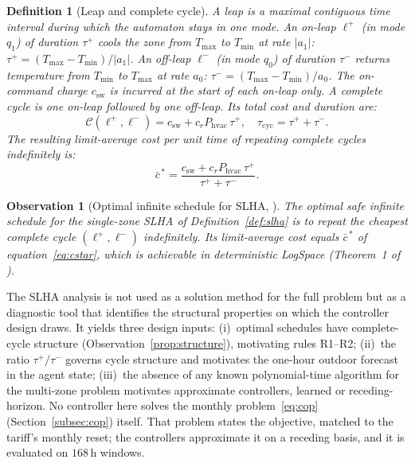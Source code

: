 \documentclass[pdflatex,sn-mathphys-num,iicol]{sn-jnl}
\theoremstyle{thmstyleone}\newtheorem{proposition}{Proposition}\newtheorem{corollary}{Corollary}
\theoremstyle{thmstyletwo}\newtheorem{remark}{Remark}\newtheorem{observation}{Observation}
\theoremstyle{thmstylethree}\newtheorem{definition}{Definition}
\newcommand{\Tmin}{T_{\min}}
\newcommand{\Tmax}{T_{\max}}
\newcommand{\csw}{c_{\mathrm{sw}}}
\newcommand{\Phvac}{P_{\mathrm{hvac}}}
\newcommand{\taup}{\tau^{+}}
\newcommand{\taum}{\tau^{-}}
\begin{document}
 
\begin{definition}[Leap and complete cycle]
\label{def:leap}
A \emph{leap} is a maximal contiguous time interval during which the automaton stays in one mode. An \emph{on-leap} $\ell^+$ (in mode $q_1$) of duration $\taup$ cools the zone from $\Tmax$ to $\Tmin$ at rate $|a_1|$: $\taup=({\Tmax-\Tmin})/{|a_1|}$. An \emph{off-leap} $\ell^-$ (in mode $q_0$) of duration $\taum$ returns temperature from $\Tmin$ to $\Tmax$ at rate $a_0$: $\taum=({\Tmax-\Tmin})/{a_0}$. The on-command charge $\csw$ is incurred at the start of each on-leap only. A \emph{complete cycle} is one on-leap followed by one off-leap. Its total cost and duration are:
\begin{equation}
  \mathcal{C}(\ell^+,\ell^-)
  = \csw + c_r\Phvac\,\taup,
  \quad
  \tau_{\mathrm{cyc}} = \taup+\taum.
  \label{eq:cycle_cost}
\end{equation}
The resulting \emph{limit-average cost per unit time} of repeating complete cycles indefinitely is:
\begin{equation}
  \bar{c}^{\,*}
  = \frac{\csw+c_r\Phvac\,\taup}{\,\taup+\taum\,}.
  \label{eq:cstar}
\end{equation}
\end{definition}
 

 
\begin{observation}[Optimal infinite schedule for SLHA, \citet{Mousa2016}]
\label{obs:optimal}
The optimal safe infinite schedule for the single-zone SLHA of Definition~\ref{def:slha} is to repeat the cheapest complete cycle $(\ell^+,\ell^-)$ indefinitely. Its limit-average cost equals $\bar{c}^{\,*}$ of equation~\eqref{eq:cstar}, which is achievable in deterministic LogSpace (Theorem~1 of \citep{Mousa2016}).
\end{observation}
 

The SLHA analysis is not used as a solution method for the full problem but as a diagnostic tool that identifies the structural properties on which the controller design draws. It yields three design inputs: (i)~optimal schedules have complete-cycle structure (Observation~\ref{prop:structure}), motivating rules R1--R2; (ii)~the ratio $\taup/\taum$ governs cycle structure and motivates the one-hour outdoor forecast in the agent state; (iii)~the absence of any known polynomial-time algorithm for the multi-zone problem \citep{Mousa2017} motivates approximate controllers, learned or receding-horizon. No controller here solves the monthly problem~\eqref{eq:cop} (Section~\ref{subsec:cop}) itself. That problem states the objective, matched to the tariff's monthly reset; the controllers approximate it on a receding basis, and it is evaluated on $168\,$h windows.
\end{document}
